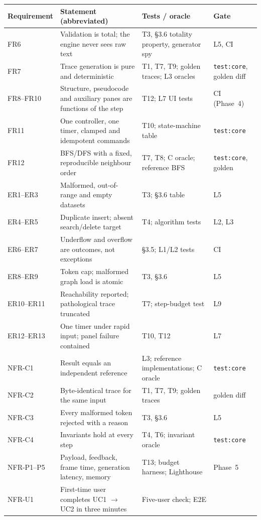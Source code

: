 \documentclass[11pt,a4paper]{article}
\newcommand{\ct}[1]{\texttt{#1}}
\begin{document}
\begin{table}[H]
\centering
\small
\setlength{\tabcolsep}{4pt}
\begin{tabular}{@{}L{2.5cm}L{6.0cm}L{4.0cm}L{3.0cm}@{}}
\toprule
\textbf{Requirement} & \textbf{Statement (abbreviated)} & \textbf{Tests / oracle} &
\textbf{Gate} \\
\midrule
FR6 & Validation is total; the engine never sees raw text & T3, \S3.6 totality property,
generator spy & L5, CI \\
FR7 & Trace generation is pure and deterministic & T1, T7, T9; golden traces; L3 oracles &
\ct{test:core}, golden diff \\
FR8--FR10 & Structure, pseudocode and auxiliary panes are functions of the step & T12; L7 UI
tests & CI (Phase~4) \\
FR11 & One controller, one timer, clamped and idempotent commands & T10; state-machine table &
\ct{test:core} \\
FR12 & BFS/DFS with a fixed, reproducible neighbour order & T7, T8; C oracle; reference BFS &
\ct{test:core}, golden \\
ER1--ER3 & Malformed, out-of-range and empty datasets & T3; \S3.6 table & L5 \\
ER4--ER5 & Duplicate insert; absent search/delete target & T4; algorithm tests & L2, L3 \\
ER6--ER7 & Underflow and overflow are outcomes, not exceptions & \S3.5; L1/L2 tests & CI \\
ER8--ER9 & Token cap; malformed graph load is atomic & T3, \S3.6 & L5 \\
ER10--ER11 & Reachability reported; pathological trace truncated & T7; step-budget test & L9 \\
ER12--ER13 & One timer under rapid input; panel failure contained & T10, T12 & L7 \\
NFR-C1 & Result equals an independent reference & L3; reference implementations; C oracle &
\ct{test:core} \\
NFR-C2 & Byte-identical trace for the same input & T1, T7, T9; golden traces & golden diff \\
NFR-C3 & Every malformed token rejected with a reason & T3, \S3.6 & L5 \\
NFR-C4 & Invariants hold at every step & T4, T6; invariant oracle & \ct{test:core} \\
NFR-P1--P5 & Payload, feedback, frame time, generation latency, memory & T13; budget harness;
Lighthouse & Phase~5 \\
NFR-U1 & First-time user completes UC1 $\to$ UC2 in three minutes & Five-user check; E2E

\end{tabular}
\end{table}
\end{document}
